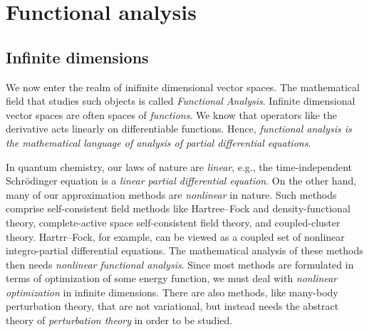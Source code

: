 
\chapter{Functional analysis}
\label{chapter:functional analysis}

\section{Infinite dimensions}






We now enter the realm of inifinite dimensional vector spaces. The mathematical field that studies such objects is called \emph{Functional Analysis}. Infinite dimensional vector spaces are often spaces of \emph{functions}. We know that operators like the derivative acts linearly on differentiable functions. Hence, \emph{functional analysis is the mathematical language of analysis of partial differential equations}.

In quantum chemistry, our laws of nature are \emph{linear}, e.g., the time-independent Schr\"odinger equation is a \emph{linear partial differential equation}. On the other hand, many of our approximation methods are \emph{nonlinear} in nature. Such methods comprise self-consistent field methods like Hartree--Fock and density-functional theory, complete-active space self-consistent field theory, and coupled-cluster theory. Hartrr--Fock, for example, can be viewed as a coupled set of nonlinear integro-partial differential equations. The mathematical analysis of these methods then needs \emph{nonlinear functional analysis}. Since most methods are formulated in terms of optimization of some energy function, we must deal with \emph{nonlinear optimization} in infinite dimensions. There are also methods, like many-body perturbation theory, that are not variational, but instead needs the abstract theory of \emph{perturbation theory} in order to be studied.

